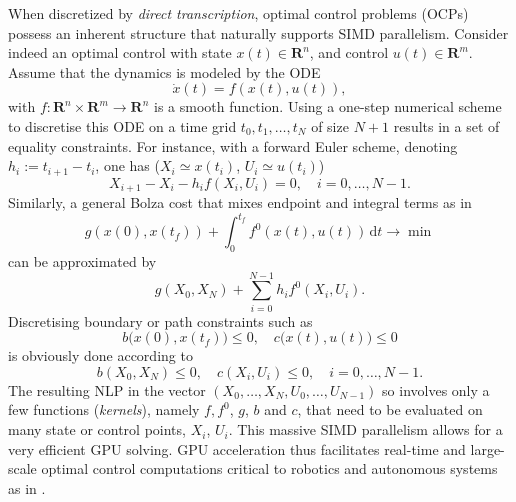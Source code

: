 \documentclass[twoside,leqno,twocolumn]{article}
\begin{document}
When discretized by \emph{direct transcription}, optimal control problems (OCPs) possess an inherent structure that naturally supports SIMD parallelism. 
Consider indeed an optimal control with state $x(t) \in \mathbf{R}^n$, and control $u(t) \in \mathbf{R}^m$. Assume that the dynamics is modeled by the ODE
$$ \dot{x}(t) = f(x(t), u(t)), $$
with $f : \mathbf{R}^n \times \mathbf{R}^m \to \mathbf{R}^n$ is a smooth function. Using a one-step numerical scheme to discretise this ODE on a time grid $t_0, t_1, \dots, t_N$ of size $N + 1$ results in a set of equality constraints. For instance, with a forward Euler scheme, denoting $h_i := t_{i+1} - t_i$, one has ($X_i \simeq x(t_i)$, $U_i \simeq u(t_i)$)
$$ X_{i+1} - X_i - h_i f(X_i, U_i) = 0,\quad i = 0, \dots, N-1. $$
Similarly, a general Bolza cost that mixes endpoint and integral terms as in
$$ g(x(0), x(t_f)) + \int_0^{t_f} f^0(x(t), u(t))\,\mathrm{d}t \to \min $$
can be approximated by
$$ g(X_0, X_N) + \sum_{i=0}^{N-1} h_i f^0(X_i, U_i). $$
Discretising boundary or path constraints such as
$$ b\big(x(0),x(t_f)\big) \leq 0,\quad c\big(x(t), u(t)\big) \leq 0 $$
is obviously done according to
$$ b(X_0, X_N) \leq 0, \quad c(X_i, U_i) \leq 0,\quad i = 0, \dots, N-1. $$
The resulting NLP in the vector $(X_0,\dots,X_N,U_0,\dots,U_{N-1})$
so involves only a few functions (\emph{kernels}), namely $f, f^0$, $g$, $b$ and $c$, that need to be evaluated on many state or control points, $X_i$, $U_i$.
This massive SIMD parallelism allows for a very efficient GPU solving. GPU acceleration thus facilitates real-time and large-scale optimal control computations critical to robotics and autonomous systems as in \cite{pacaud2024gpu}.

\end{document}
